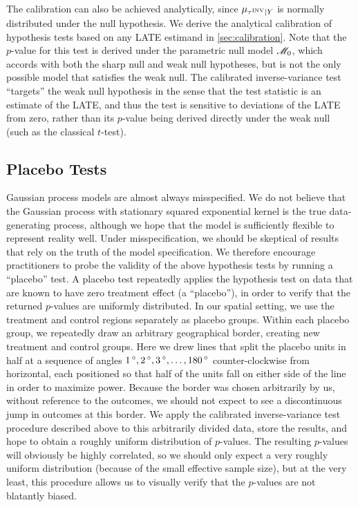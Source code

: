 The calibration can also be achieved analytically, since \(\mu_{\tau^{\mathrm{INV}} \mid Y}\) is normally distributed under the null hypothesis.
We derive the analytical calibration of hypothesis tests based on any LATE estimand in \autoref{sec:calibration}.
Note that the \(p\)-value for this test is derived under the parametric null model \(\mathscr{M}_0\), which accords with both the sharp null and weak null hypotheses, but is not the only possible model that satisfies the weak null.
The calibrated inverse-variance test “targets” the weak null hypothesis in the sense that the test statistic is an estimate of the LATE, and thus the test is sensitive to deviations of the LATE from zero, rather than its \(p\)-value being derived directly under the weak null (such as the classical \(t\)-test).

\label{eq:calib_test}

\subsection{Placebo Tests}
\label{sec:placebo}
Gaussian process models are almost always misspecified.
We do not believe that the Gaussian process with stationary squared exponential kernel is the true data-generating process, although we hope that the model is sufficiently flexible to represent reality well.
Under misspecification, we should be skeptical of results that rely on the truth of the model specification.
We therefore encourage practitioners to probe the validity of the above hypothesis tests by running a ``placebo'' test.
A placebo test repeatedly applies the hypothesis test on data that are known to have zero treatment effect (a ``placebo''),
in order to verify that the returned \(p\)-values are uniformly distributed.
In our spatial setting, we use the treatment and control regions separately as placebo groups.
Within each placebo group, we repeatedly draw an arbitrary geographical border, creating new treatment and control groups.
Here we drew lines that split the placebo units in half at a sequence of angles \(1{\,^\circ},2{\,^\circ},3{\,^\circ},\dotsc,180{\,^\circ}\) counter-clockwise from horizontal, each positioned so that half of the units fall on either side of the line in order to maximize power.
Because the border was chosen arbitrarily by us, without reference to the outcomes, we should not expect to see a discontinuous jump in outcomes at this border.
We apply the calibrated inverse-variance test procedure described above to this arbitrarily divided data, store the results, and hope to obtain a roughly uniform distribution of \(p\)-values.
The resulting \(p\)-values will obviously be highly correlated, so we should only expect a very roughly uniform distribution (because of the small effective sample size), but at the very least, this procedure allows us to visually verify that the \(p\)-values are not blatantly biased.

